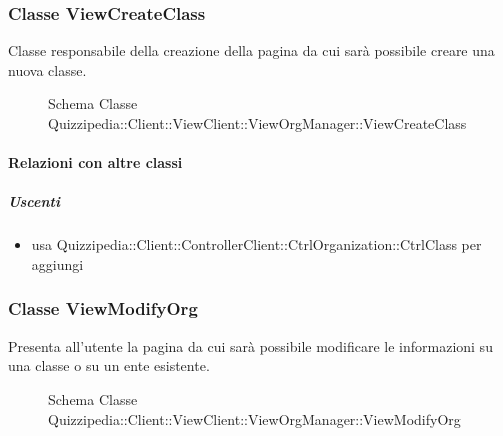 \subsubsection{Classe ViewCreateClass}
Classe responsabile della creazione della pagina da cui sarà possibile creare una nuova classe.
\begin{figure}[H]
\centering
\noindent{}
\caption[Schema Classe ViewCreateClass]{Schema Classe Quizzipedia::Client::ViewClient::ViewOrgManager::ViewCreateClass}
\end{figure}
\paragraph{Relazioni con altre classi}
\subparagraph{Uscenti}
\begin{itemize}
\item usa Quizzipedia::Client::ControllerClient::CtrlOrganization::CtrlClass per aggiungi
\end{itemize}
\subsubsection{Classe ViewModifyOrg}
Presenta all'utente la pagina da cui sarà possibile modificare le informazioni su una classe o su un ente esistente.
\begin{figure}[H]
\centering
\noindent{}
\caption[Schema Classe ViewModifyOrg]{Schema Classe Quizzipedia::Client::ViewClient::ViewOrgManager::ViewModifyOrg}
\end{figure}
